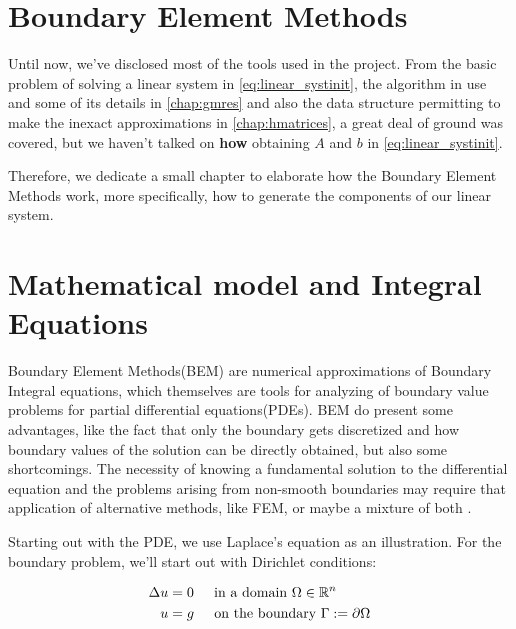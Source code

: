 \section{Boundary Element Methods}

Until now, we've disclosed most of the tools used in the project. From the basic problem of solving a linear system in \ref{eq:linear_systinit}, the algorithm in use and some of its details in \autoref{chap:gmres} and also the data structure permitting to make the inexact approximations in \autoref{chap:hmatrices}, a great deal of ground was covered, but we haven't talked on \textbf{how} obtaining $A$ and $b$ in \ref{eq:linear_systinit}.

Therefore, we dedicate a small chapter to elaborate how the Boundary Element Methods work, more specifically, how to generate the components of our linear system.

\section{Mathematical model and Integral Equations}

Boundary Element Methods(BEM) are numerical approximations of Boundary Integral equations, which themselves are tools for analyzing of boundary value problems for partial differential equations(PDEs). BEM do present some advantages, like the fact that only the boundary gets discretized and how boundary values of the solution can be directly obtained, but also some shortcomings. The necessity of knowing a fundamental solution to the differential equation and the problems arising from non-smooth boundaries may require that application of alternative methods, like FEM, or maybe a mixture of both \cite{costabel1987principles}.

Starting out with the PDE, we use Laplace's equation as an illustration. For the boundary problem, we'll start out with Dirichlet conditions:



\begin{align}\label{eq:pde_model}
    \begin{split}
        \Delta u &= 0 \hspace{0.2in} \text{in a domain } \Omega \in \mathbb{R}^{n}\\
        u &= g \hspace{0.2in} \text{on the boundary } \Gamma := \partial \Omega
    \end{split}
\end{align}

